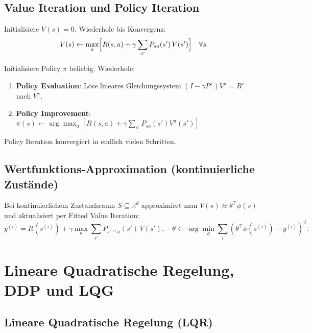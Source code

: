 \documentclass[11pt]{article}
\theoremstyle{csthm}
\theoremstyle{csdef}
\newcommand{\R}{\mathbb{R}}
\newcommand{\T}{^\top}
\begin{document}
\subsection{Value Iteration und Policy Iteration}

\begin{tcolorbox}[algostyle, title={Value Iteration}]
Initialisiere $V(s) = 0$. Wiederhole bis Konvergenz:
\[
  V(s) \leftarrow \max_a \Bigl[R(s,a) + \gamma \sum_{s'} P_{sa}(s')\,V(s')\Bigr]
  \quad \forall s
\]
\end{tcolorbox}

\begin{tcolorbox}[algostyle, title={Policy Iteration}]
Initialisiere Policy $\pi$ beliebig. Wiederhole:
\begin{enumerate}[leftmargin=*, itemsep=1pt]
  \item \textbf{Policy Evaluation}: Löse linea\-res Gleichungssystem
        $(I - \gamma P^\pi)V^\pi = R^\pi$ nach $V^\pi$.
  \item \textbf{Policy Improvement}:
        $\pi(s) \leftarrow \arg\max_a [R(s,a) + \gamma \sum_{s'} P_{sa}(s') V^\pi(s')]$
\end{enumerate}
Policy Iteration konvergiert in endlich vielen Schritten.
\end{tcolorbox}

\subsection{Wertfunktions-Approximation (kontinuierliche Zustände)}

Bei kontinuierlichem Zustandsraum $S \subseteq \R^d$ approximiert man
$V(s) \approx \theta\T \phi(s)$ und aktualisiert per Fitted Value Iteration:
\begin{equation}
  y^{(i)} = R(s^{(i)}) + \gamma \max_a \sum_{s'} P_{s^{(i)} a}(s')\,V(s'),
  \quad \theta \leftarrow \arg\min_\theta \sum_i (\theta\T\phi(s^{(i)}) - y^{(i)})^2.
\end{equation}

\section{Lineare Quadratische Regelung, DDP und LQG}

\subsection{Lineare Quadratische Regelung (LQR)}
\end{document}
